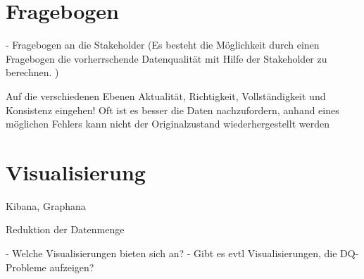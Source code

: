 \section{Fragebogen}

- Fragebogen an die Stakeholder (Es besteht die Möglichkeit durch einen Fragebogen die vorherrschende Datenqualität mit Hilfe der Stakeholder zu berechnen. \cite{pipino2002})

Auf die verschiedenen Ebenen Aktualität, Richtigkeit, Vollständigkeit und Konsistenz eingehen!
Oft ist es besser die Daten nachzufordern, anhand eines möglichen Fehlers kann nicht der Originalzustand wiederhergestellt werden

\section{Visualisierung}
Kibana, Graphana

Reduktion der Datenmenge



- Welche Visualisierungen bieten sich an?
- Gibt es evtl Visualisierungen, die DQ-Probleme aufzeigen?


